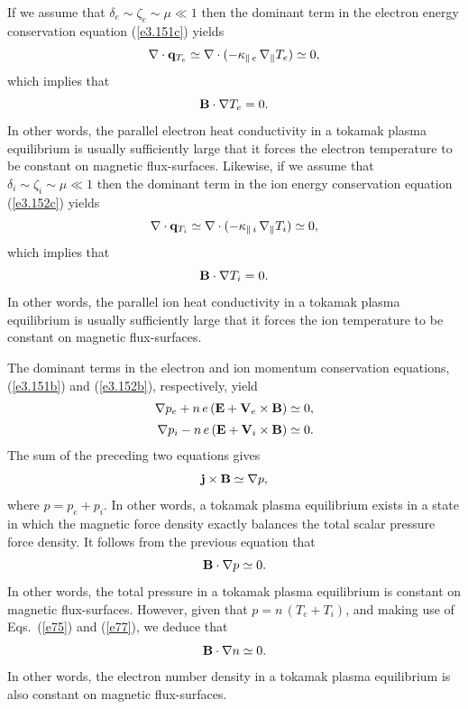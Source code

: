 \documentclass[notitlepage,12pt]{article}
\begin{document}
If we assume that $\delta_e\sim \zeta_e\sim \mu\ll 1$ then the dominant term in the electron energy conservation equation
(\ref{e3.151c}) yields
\begin{equation}
\nabla\cdot{\bf q}_{T_e}\simeq \nabla\cdot(-\kappa_{\parallel\,e}\,\nabla_\parallel T_e)\simeq 0,
\end{equation}
which implies that 
\begin{equation}
{\bf B}\cdot\nabla T_e=0. \label{e75}
\end{equation}
In other words, the parallel electron heat conductivity in a tokamak plasma equilibrium is usually
sufficiently large that it forces the electron temperature to be constant on magnetic flux-surfaces. 
Likewise, if we assume that $\delta_i\sim \zeta_i\sim \mu\ll 1$ then the dominant term in the ion energy conservation equation
(\ref{e3.152c}) yields
\begin{equation}
\nabla\cdot{\bf q}_{T_i}\simeq \nabla\cdot(-\kappa_{\parallel\,i}\,\nabla_\parallel T_i)\simeq 0,
\end{equation}
which implies that 
\begin{equation}
{\bf B}\cdot\nabla T_i=0.\label{e77}
\end{equation}
In other words, the parallel ion heat conductivity in a tokamak plasma equilibrium is usually
sufficiently large that it forces the ion temperature to be constant on magnetic flux-surfaces. 

 The dominant terms in the electron and ion momentum conservation equations,
(\ref{e3.151b}) and (\ref{e3.152b}), respectively, yield
\begin{align}\label{e78}
\nabla p_e + n\,e\,({\bf E}+{\bf V}_e\times {\bf B}) &\simeq 0,\\[0.5ex]
\nabla p_i - n\,e\,({\bf E}+{\bf V}_i\times {\bf B}) &\simeq 0.\label{e79}
\end{align}
The sum of the preceding two equations gives
\begin{equation}\label{e80}
 {\bf j}\times {\bf B} \simeq\nabla p,
\end{equation}
where $p=p_e+p_i$. In other words, a  tokamak plasma equilibrium exists in a state in which the magnetic force density exactly balances the  total scalar pressure force density. 
It follows from the previous equation that 
\begin{equation}\label{e81}
{\bf B}\cdot\nabla p\simeq 0.
\end{equation}
In other words, the total pressure in a  tokamak plasma equilibrium is constant on magnetic flux-surfaces. 
 However, given that $p=n\,(T_e+T_i)$, and making use of Eqs.~(\ref{e75}) and (\ref{e77}), we deduce that 
\begin{equation}
{\bf B}\cdot\nabla n\simeq 0.
\end{equation}
In other words, the electron number density in a  tokamak plasma equilibrium is also  constant on
magnetic flux-surfaces. 
\end{document}
